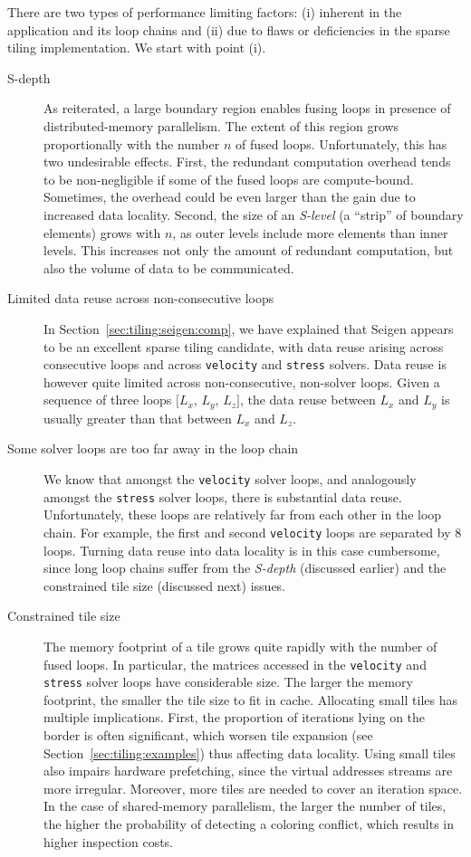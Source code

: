 There are two types of performance limiting factors: (i) inherent in the application and its loop chains and (ii) due to flaws or deficiencies in the sparse tiling implementation. We start with point (i).

\begin{description}
\item[S-depth] As reiterated, a large boundary region enables fusing loops in presence of distributed-memory parallelism. The extent of this region grows proportionally with the number $n$ of fused loops. Unfortunately, this has two undesirable effects. First, the redundant computation overhead tends to be non-negligible if some of the fused loops are compute-bound. Sometimes, the overhead could be even larger than the gain due to increased data locality. Second, the size of an {\em S-level} (a ``strip'' of boundary elements) grows with $n$, as outer levels include more elements than inner levels. This increases not only the amount of redundant computation, but also the volume of data to be communicated. 

\item[Limited data reuse across non-consecutive loops] In Section~\ref{sec:tiling:seigen:comp}, we have explained that Seigen appears to be an excellent sparse tiling candidate, with data reuse arising across consecutive loops and across {\tt velocity} and {\tt stress} solvers. Data reuse is however quite limited across non-consecutive, non-solver loops. Given a sequence of three loops $[L_x$, $L_y$, $L_z]$, the data reuse between $L_x$ and $L_y$ is usually greater than that between $L_x$ and $L_z$. 

\item[Some solver loops are too far away in the loop chain] We know that amongst the {\tt velocity} solver loops, and analogously amongst the {\tt stress} solver loops, there is substantial data reuse. Unfortunately, these loops are relatively far from each other in the loop chain. For example, the first and second {\tt velocity} loops are separated by 8 loops. Turning data reuse into data locality is in this case cumbersome, since long loop chains suffer from the {\em S-depth} (discussed earlier) and the constrained tile size (discussed next) issues.

\item[Constrained tile size] The memory footprint of a tile grows quite rapidly with the number of fused loops. In particular, the matrices accessed in the {\tt velocity} and {\tt stress} solver loops have considerable size. The larger the memory footprint, the smaller the tile size to fit in cache. Allocating small tiles has multiple implications. First, the proportion of iterations lying on the border is often significant, which worsen tile expansion (see Section~\ref{sec:tiling:examples}) thus affecting data locality. Using small tiles also impairs hardware prefetching, since the virtual addresses streams are more irregular. Moreover, more tiles are needed to cover an iteration space. In the case of shared-memory parallelism, the larger the number of tiles, the higher the probability of detecting a coloring conflict, which results in higher inspection costs.


\end{description}

